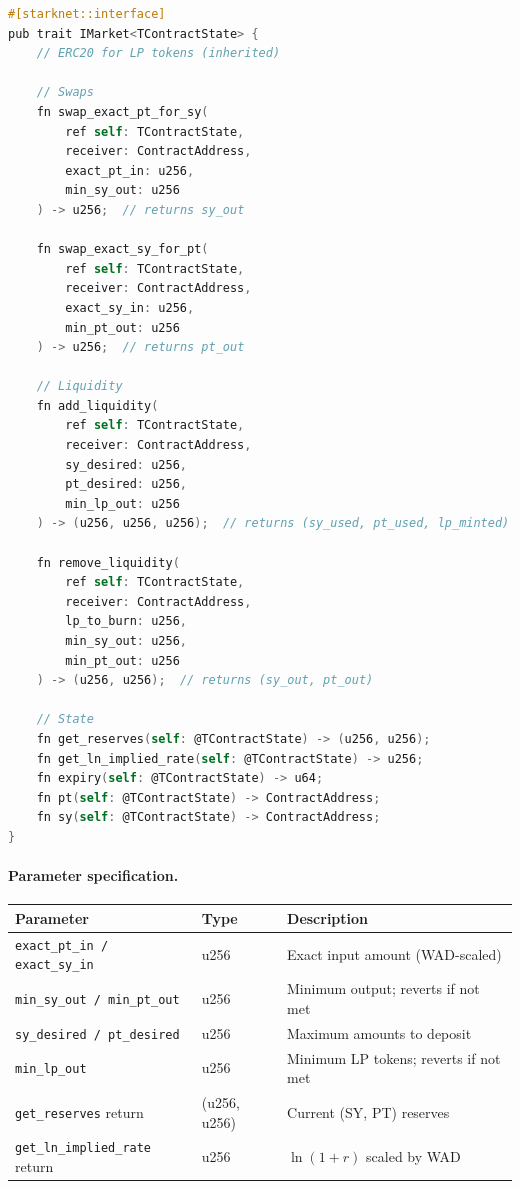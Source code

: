 \begin{lstlisting}[language=C,basicstyle=\ttfamily\small,frame=single,breaklines=true,columns=fullflexible]
#[starknet::interface]
pub trait IMarket<TContractState> {
    // ERC20 for LP tokens (inherited)

    // Swaps
    fn swap_exact_pt_for_sy(
        ref self: TContractState,
        receiver: ContractAddress,
        exact_pt_in: u256,
        min_sy_out: u256
    ) -> u256;  // returns sy_out

    fn swap_exact_sy_for_pt(
        ref self: TContractState,
        receiver: ContractAddress,
        exact_sy_in: u256,
        min_pt_out: u256
    ) -> u256;  // returns pt_out

    // Liquidity
    fn add_liquidity(
        ref self: TContractState,
        receiver: ContractAddress,
        sy_desired: u256,
        pt_desired: u256,
        min_lp_out: u256
    ) -> (u256, u256, u256);  // returns (sy_used, pt_used, lp_minted)

    fn remove_liquidity(
        ref self: TContractState,
        receiver: ContractAddress,
        lp_to_burn: u256,
        min_sy_out: u256,
        min_pt_out: u256
    ) -> (u256, u256);  // returns (sy_out, pt_out)

    // State
    fn get_reserves(self: @TContractState) -> (u256, u256);
    fn get_ln_implied_rate(self: @TContractState) -> u256;
    fn expiry(self: @TContractState) -> u64;
    fn pt(self: @TContractState) -> ContractAddress;
    fn sy(self: @TContractState) -> ContractAddress;
}
\end{lstlisting}

\paragraph{Parameter specification.}
\begin{center}
\begin{tabular}{l l l}
\toprule
\textbf{Parameter} & \textbf{Type} & \textbf{Description} \\
\midrule
\texttt{exact\_pt\_in / exact\_sy\_in} & u256 & Exact input amount (WAD-scaled) \\
\texttt{min\_sy\_out / min\_pt\_out} & u256 & Minimum output; reverts if not met \\
\texttt{sy\_desired / pt\_desired} & u256 & Maximum amounts to deposit \\
\texttt{min\_lp\_out} & u256 & Minimum LP tokens; reverts if not met \\
\texttt{get\_reserves} return & (u256, u256) & Current (SY, PT) reserves \\
\texttt{get\_ln\_implied\_rate} return & u256 & $\ln(1+r)$ scaled by WAD \\
\bottomrule
\end{tabular}
\end{center}

